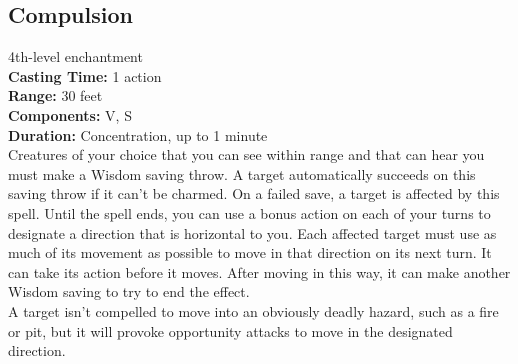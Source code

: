 \documentclass[11pt, A4paper, english]{article}
\begin{document}
		\subsection{Compulsion}
4th-level enchantment \\
\textbf{Casting Time:} 1 action \\
\textbf{Range:} 30 feet \\
\textbf{Components:} V, S \\
\textbf{Duration:} Concentration, up to 1 minute \\
Creatures of your choice that you can see within range and that can hear you must make a Wisdom saving throw. A target automatically succeeds on this saving
throw if it can’t be charmed. On a failed save, a target is affected by this spell. Until the spell ends, you can use a bonus action on each of your turns to designate a direction that is horizontal to you. Each affected target must use as much of its movement as possible to move in that direction on its next turn. It can take its action before it moves. After moving in this way, it can make another Wisdom saving to try to end the effect. \\
A target isn’t compelled to move into an obviously deadly hazard, such as a fire or pit, but it will provoke opportunity attacks to move in the designated direction.
\end{document}
